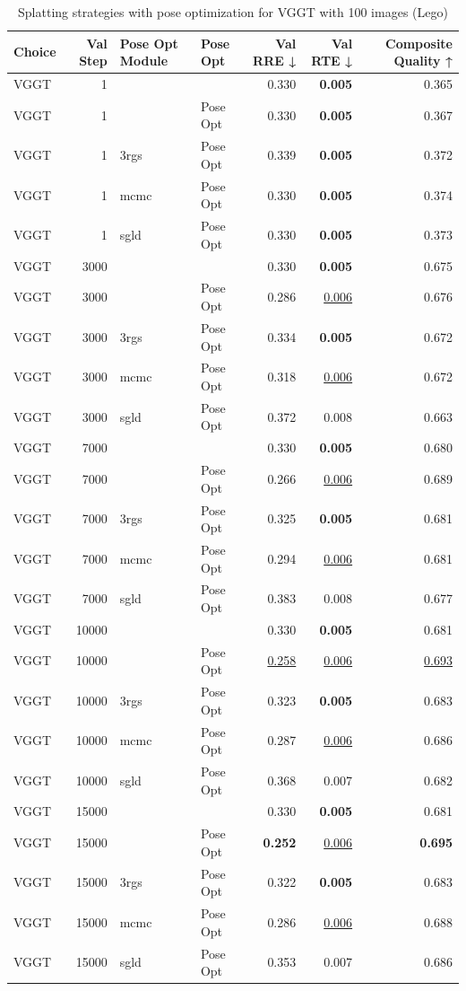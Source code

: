 \begin{table}[H]
\caption{Splatting strategies with pose optimization for VGGT with 100 images (Lego)}
\label{tab:99_pose_opt_module_lego}
\begin{tabular}{lrllrrr}
\toprule
Choice & Val Step & Pose Opt Module & Pose Opt & Val RRE ↓ & Val RTE ↓ & Composite Quality ↑ \\
\midrule
VGGT & 1 &  &  & 0.330 & \textbf{0.005} & 0.365 \\
VGGT & 1 &  & Pose Opt & 0.330 & \textbf{0.005} & 0.367 \\
VGGT & 1 & 3rgs & Pose Opt & 0.339 & \textbf{0.005} & 0.372 \\
VGGT & 1 & mcmc & Pose Opt & 0.330 & \textbf{0.005} & 0.374 \\
VGGT & 1 & sgld & Pose Opt & 0.330 & \textbf{0.005} & 0.373 \\
VGGT & 3000 &  &  & 0.330 & \textbf{0.005} & 0.675 \\
VGGT & 3000 &  & Pose Opt & 0.286 & \underline{0.006} & 0.676 \\
VGGT & 3000 & 3rgs & Pose Opt & 0.334 & \textbf{0.005} & 0.672 \\
VGGT & 3000 & mcmc & Pose Opt & 0.318 & \underline{0.006} & 0.672 \\
VGGT & 3000 & sgld & Pose Opt & 0.372 & 0.008 & 0.663 \\
VGGT & 7000 &  &  & 0.330 & \textbf{0.005} & 0.680 \\
VGGT & 7000 &  & Pose Opt & 0.266 & \underline{0.006} & 0.689 \\
VGGT & 7000 & 3rgs & Pose Opt & 0.325 & \textbf{0.005} & 0.681 \\
VGGT & 7000 & mcmc & Pose Opt & 0.294 & \underline{0.006} & 0.681 \\
VGGT & 7000 & sgld & Pose Opt & 0.383 & 0.008 & 0.677 \\
VGGT & 10000 &  &  & 0.330 & \textbf{0.005} & 0.681 \\
VGGT & 10000 &  & Pose Opt & \underline{0.258} & \underline{0.006} & \underline{0.693} \\
VGGT & 10000 & 3rgs & Pose Opt & 0.323 & \textbf{0.005} & 0.683 \\
VGGT & 10000 & mcmc & Pose Opt & 0.287 & \underline{0.006} & 0.686 \\
VGGT & 10000 & sgld & Pose Opt & 0.368 & 0.007 & 0.682 \\
VGGT & 15000 &  &  & 0.330 & \textbf{0.005} & 0.681 \\
VGGT & 15000 &  & Pose Opt & \textbf{0.252} & \underline{0.006} & \textbf{0.695} \\
VGGT & 15000 & 3rgs & Pose Opt & 0.322 & \textbf{0.005} & 0.683 \\
VGGT & 15000 & mcmc & Pose Opt & 0.286 & \underline{0.006} & 0.688 \\
VGGT & 15000 & sgld & Pose Opt & 0.353 & 0.007 & 0.686 \\
\bottomrule
\end{tabular}
\end{table}
